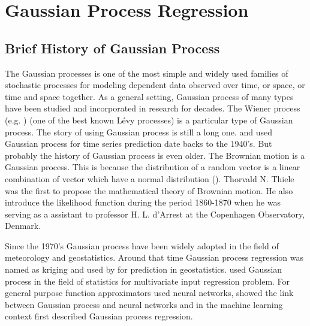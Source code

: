 \chapter{Gaussian Process Regression} \label{ch:GaussianProcessRegression}

\ifpdf
    \graphicspath{{Chapter3/Figs/Raster/}{Chapter3/Figs/PDF/}{Chapter3/Figs/}}
\else
    \graphicspath{{Chapter3/Figs/Vector/}{Chapter3/Figs/}}
\fi

\section{Brief History of Gaussian Process}
The Gaussian processes is one of the most simple and widely used families of stochastic processes 
for modeling dependent data observed over time, or space, or time and space together. As a general
setting, Gaussian process of many types have been studied and incorporated in research for decades.
The Wiener process (e.g. \cite{Papoulis:1991}) (one of the best known L\'{e}vy processes) is a 
particular type of Gaussian process. The story of using Gaussian process is still a long one. 
\cite{Kolmogorov:1941} and \cite{Wiener:1949} used Gaussian process for time series prediction
date backs to the 1940's.
But probably the history of Gaussian process is even older. 
The Brownian motion is a Gaussian process. This is because the distribution of a random vector 
is a linear combination of vector which have a normal distribution (\cite{Castaneda:2012}).
Thorvald N. Thiele was the first to propose the mathematical theory of Brownian motion. He also 
introduce the likelihood function during the period 1860-1870 when he was serving 
as a assistant to professor H. L. d'Arrest at the Copenhagen Observatory, Denmark. 

Since the 1970's Gaussian process have been widely adopted in the field of meteorology and
geostatistics. Around that time Gaussian process regression was named as kriging and 
used by \cite{Matheron:1973} for prediction in geostatistics. \cite{O'Hagan:1978} used 
Gaussian process in the field of statistics for multivariate input regression problem.
For general purpose function approximators \cite{Bishop:1995} used neural networks,
\cite{Neal:1996} showed the link between Gaussian process and neural networks and
in the machine learning context \cite{Williams_and_Rasmussen:1996} first described 
Gaussian process regression. 

